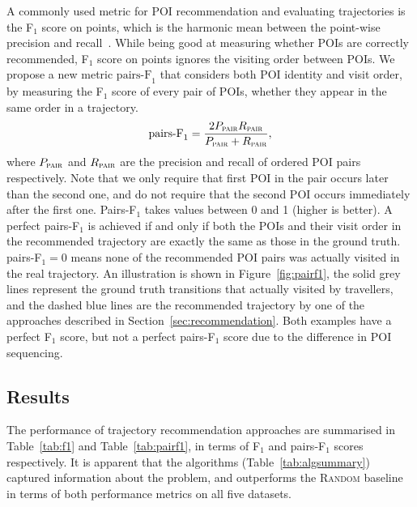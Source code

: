 A commonly used metric for POI recommendation and evaluating trajectories is
the F$_1$ score on points, which is the harmonic mean between the point-wise precision and recall~\cite{ijcai15}.
While being good at measuring whether POIs are correctly recommended,
F$_1$ score on points ignores the visiting order between POIs.
We propose a new metric $\text{pairs-F}_1$ that considers both POI identity and visit order,
by measuring the F$_1$ score of every pair of POIs,
whether they appear in the same order in a trajectory.
\eqmoveup
\begin{displaymath}
\text{pairs-F}_1 = \frac{2 P_{\textsc{pair}} R_{\textsc{pair}}}
                        {P_{\textsc{pair}} + R_{\textsc{pair}}},
\end{displaymath}
where $P_{\textsc{pair}}$ and $R_{\textsc{pair}}$ are the precision and recall of ordered POI pairs respectively. Note that we only require that first POI in the pair occurs
later than the second one,
and do not require that the second POI occurs immediately after the first one.
Pairs-F$_1$ takes values between 0 and 1 (higher is better).
A perfect pairs-F$_1$ is achieved if and only if
both the POIs and their visit order in the
recommended trajectory are exactly the same as those in the ground truth.
pairs-F$_1 = 0$ means none of the recommended POI pairs was actually visited in the real trajectory.
An illustration is shown in Figure~\ref{fig:pairf1},
the solid grey lines represent the ground truth transitions that actually visited by travellers,
and the dashed blue lines are the recommended trajectory by one of the approaches described in Section~\ref{sec:recommendation}.
Both examples have a perfect F$_1$ score, but not a perfect pairs-F$_1$ score due to the difference in POI sequencing.



\subsection{Results}
\label{sec:result}


%
%
%

The performance of trajectory recommendation approaches are summarised in
Table~\ref{tab:f1} and Table~\ref{tab:pairf1},
in terms of F$_1$ and pairs-F$_1$ scores respectively.
It is apparent that the algorithms (Table~\ref{tab:algsummary})
captured information about the problem, and
outperforms the \textsc{Random} baseline in terms of both performance metrics on all five datasets.


